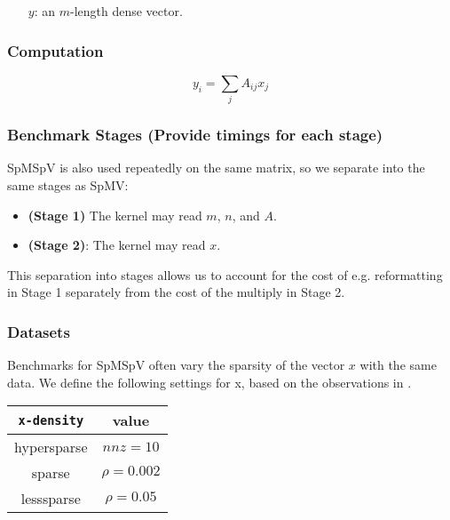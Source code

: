 \documentclass{article}
\begin{document}
\begin{itemize}
	\item[$y$:] an $m$-length dense vector.
\end{itemize}

\subsubsection{Computation}

$$y_i = \sum_{j}A_{ij}x_j$$

\subsubsection{Benchmark Stages (Provide timings for each stage)}

SpMSpV is also used repeatedly on the same matrix, so we separate into the same stages as SpMV:

\begin{itemize}
\item \textbf{(Stage 1)}
	The kernel may read $m$, $n$, and $A$.
\item \textbf{(Stage 2)}:
	The kernel may read $x$.
\end{itemize}

This separation into stages allows us to account for the cost of e.g. reformatting in Stage 1 separately from the cost of the multiply in Stage 2.

\subsubsection{Datasets}

Benchmarks for SpMSpV often vary the sparsity of the vector $x$ with the same data. We define the following settings for x, based on the observations in \cite{azad_work-efficient_2017}.
\begin{tabular}{|c|c|}\hline
	\texttt{x-density} & value\\
	\hline
	hypersparse & $nnz = 10$\\
	sparse & $\rho = 0.002$\\
	lesssparse & $\rho = 0.05$\\\hline
\end{tabular}
\end{document}
